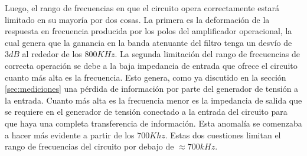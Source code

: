 Luego, el rango de frecuencias en que el circuito opera correctamente estará limitado en su mayoría por dos cosas. La primera es la deformación de la respuesta en frecuencia producida por los polos del amplificador operacional, la cual genera que la ganancia en la banda atenuante del filtro tenga un desvío de $3dB$ al rededor de los $800KHz$. La segunda limitación del rango de frecuencias de correcta operación se debe a la baja impedancia de entrada que ofrece el circuito cuanto más alta es la frecuencia. Esto genera, como ya discutido en la sección \ref{sec:mediciones} una pérdida de información por parte del generador de tensión a la entrada. Cuanto más alta es la frecuencia menor es la impedancia de salida que se requiere en el generador de tensión conectado a la entrada del circuito para que haya una completa transferencia de información. Esta anomalía se comenzaba a hacer más evidente a partir de los $700Khz$. Estas dos cuestiones limitan el rango de frecuencias del circuito por debajo de $\approx 700kHz$.